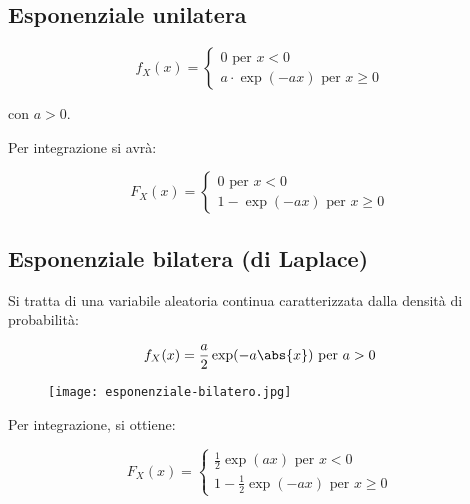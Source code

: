 \subsection{Esponenziale unilatera} 

{
    \Large 
    \begin{equation}
        f_X (x) 
        = 
        \begin{cases} 
            0 
            \text{ per } 
            x < 0
            \\
            a \cdot \exp(-a x) 
            \text{ per } 
            x \geq 0 
        \end{cases}
    \end{equation}
} 

con $a > 0$. \newline 

Per integrazione si avrà: 

{
    \Large 
    \begin{equation}
        F_X (x) 
        = 
        \begin{cases} 
            0 
            \text{ per } 
            x < 0
            \\
            1 - \exp(-a x) 
            \text{ per } 
            x \geq 0 
        \end{cases}
    \end{equation}
} 

\subsection{Esponenziale bilatera (di Laplace)} 

Si tratta di una variabile aleatoria continua caratterizzata dalla densità di probabilità: 

{
    \Large 
    \begin{equation}
        f_X (x) 
        = 
        \frac{a}{2}
        \exp(-a \abs{x}) 
        \text{ per } 
        a > 0
    \end{equation}
}

\begin{figure}[h]
    \centering
    \texttt{[image: esponenziale-bilatero.jpg]}
\end{figure} 

Per integrazione, si ottiene: 

{
    \Large 
    \begin{equation}
        F_X (x) = 
        \begin{cases}
            \frac{1}{2} \exp(ax) \text{ per } x<0 \\ 
            1 - \frac{1}{2} \exp(-ax) \text{ per } x \geq 0 
        \end{cases}
    \end{equation}
}

